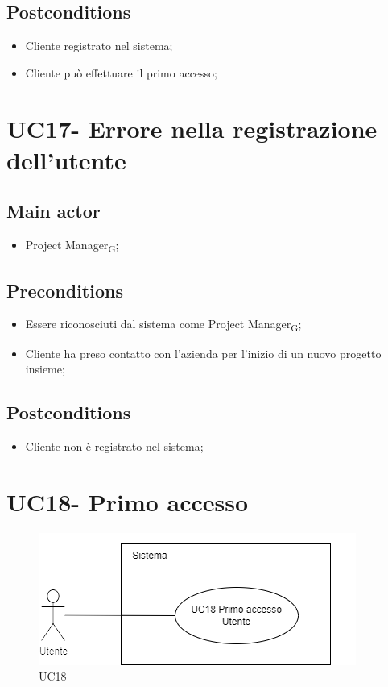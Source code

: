 \documentclass{article}
\begin{document}
    \subsection*{Postconditions}
        \begin{itemize}
            \item Cliente registrato nel sistema;
            \item Cliente può effettuare il primo accesso;
        \end{itemize}

\section{UC17- Errore nella registrazione dell'utente}
\subsection*{Main actor}
        \begin{itemize}
            \item Project Manager\textsubscript{G};
        \end{itemize}
        
    \subsection*{Preconditions}
        \begin{itemize}
            \item Essere riconosciuti dal sistema come Project Manager\textsubscript{G};
            \item Cliente ha preso contatto con l'azienda per l'inizio di un nuovo progetto insieme;
        \end{itemize}
        
    \subsection*{Postconditions}
        \begin{itemize}
            \item Cliente non è registrato nel sistema;
        \end{itemize}
\section{UC18- Primo accesso}
 \begin{figure}[h]
          \centering
          \includegraphics{./imgUML/UC18.png}
            \caption{UC18}
          \label{fig:UC18}
        \end{figure}
\end{document}
